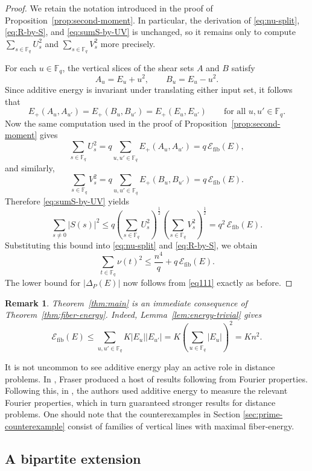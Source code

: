 \documentclass{article}
\newtheorem{remark}[theorem]{Remark}
\newcommand{\F}{\mathbb{F}}
\newcommand{\1}{\mathbf{1}}
\begin{document}
\begin{proof}
We retain the notation introduced in the proof of Proposition~\ref{prop:second-moment}. In particular, the derivation of \eqref{eq:nu-split}, \eqref{eq:R-by-S}, and \eqref{eq:sumS-by-UV} is unchanged, so it remains only to compute $\sum\limits_{s\in\F_q}U_s^2$ and $\sum\limits_{s\in\F_q}V_s^2$ more precisely.

For each $u\in\F_q$, the vertical slices of the shear sets $A$ and $B$ satisfy
\[
A_u=E_u+u^2,
\qquad
B_u=E_u-u^2.
\]
Since additive energy is invariant under translating either input set, it follows that
\[
E_+(A_u,A_{u'})=E_+(B_u,B_{u'})=E_+(E_u,E_{u'})
\qquad\text{for all }u,u'\in\F_q.
\]
Now the same computation used in the proof of Proposition~\ref{prop:second-moment} gives
\[
\sum_{s\in\F_q}U_s^2
=
q\sum_{u,u'\in\F_q}E_+(A_u,A_{u'})
=
q\,\mathcal{E}_{\mathrm{fib}}(E),
\]
and similarly,
\[
\sum_{s\in\F_q}V_s^2
=
q\sum_{u,u'\in\F_q}E_+(B_u,B_{u'})
=
q\,\mathcal{E}_{\mathrm{fib}}(E).
\]
Therefore \eqref{eq:sumS-by-UV} yields
\[
\sum_{s\ne 0}|S(s)|^2
\le
q\left(\sum_{s\in\F_q}U_s^2\right)^{\frac{1}{2}}
\left(\sum_{s\in\F_q}V_s^2\right)^{\frac{1}{2}}
=
q^2\,\mathcal{E}_{\mathrm{fib}}(E).
\]
Substituting this bound into \eqref{eq:nu-split} and \eqref{eq:R-by-S}, we obtain
\[
\sum_{t\in\F_q}\nu(t)^2
\le
\frac{n^4}{q}+q\,\mathcal{E}_{\mathrm{fib}}(E).
\]
The lower bound for $|\Delta_P(E)|$ now follows from \eqref{eq111} exactly as before.
\end{proof}

\begin{remark}
Theorem~\ref{thm:main} is an immediate consequence of Theorem~\ref{thm:fiber-energy}. Indeed, Lemma~\ref{lem:energy-trivial} gives
\[
\mathcal{E}_{\mathrm{fib}}(E)
\le
\sum_{u,u'\in\F_q}K|E_u| |E_{u'}|
=
K\left(\sum_{u\in\F_q}|E_u|\right)^2
=
Kn^2.
\]
\end{remark}

It is not uncommon to see additive energy play an active role in distance problems. In \cite{fraser2}, Fraser produced a host of results following from Fourier properties. Following this, in \cite{CGKPTZ25}, the authors used additive energy to measure the relevant Fourier properties, which in turn guaranteed stronger results for distance problems. One should note that the counterexamples in Section \ref{sec:prime-counterexample} consist of families of vertical lines with maximal fiber-energy.

\subsection{A bipartite extension}\label{sec:bipartite}
\end{document}
